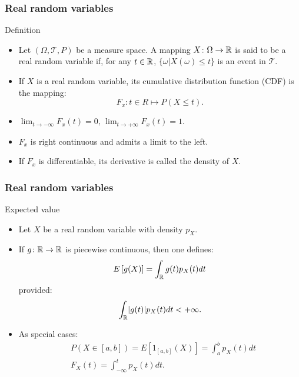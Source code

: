\begin{frame}
    \frametitle{Real random variables}
\begin{block}{Definition}
    \begin{itemize}
    \item<+-> Let $\left( \Omega, \mathcal{T}, P \right)$ be a measure space. A mapping $X \colon \Omega \to \mathbb{R}$ is
    said to be a real random variable if, for any $t \in \mathbb{R}$, $\{ \omega \vert X(\omega) \leq t \}$ is an event in $\mathcal{T}.$
    \item<+-> If $X$ is a real random variable, its cumulative distribution function (CDF) is the mapping:
    \begin{equation}
        F_x \colon t \in R \mapsto P\left( X \leq t \right).
    \end{equation}
    \item<+-> $\lim_{t \to -\infty}F_x(t) = 0, \, \lim_{t \to +\infty} F_x(t)=1.$
    \item<+-> $F_x$ is right continuous and admits a limit to the left.
    \item<+-> If $F_x$ is differentiable, its derivative is called the density of $X$.
    \end{itemize}
\end{block}
\end{frame}
\begin{frame}
    \frametitle{Real random variables}
\begin{block}{Expected value}
    \begin{itemize}
    \item<+-> Let $X$ be a real random variable with density $p_X$. 
    \item<+-> If $g \colon \mathbb{R} \to \mathbb{R}$ is piecewise continuous, then one defines:
    \begin{equation}
        E\left[ g(X) \right] = \int_{\mathbb{R}} g(t) p_X(t) dt
    \end{equation} 
    provided:
\begin{equation}
    \int_{\mathbb{R}} \lvert g(t) \rvert p_X(t) dt < +\infty.
\end{equation}
    \item<+-> As special cases:
    \begin{equation}
        \begin{split}
        & P\left( X \in [a,b] \right) = E \left[ 1_{[a,b]}(X) \right] = \int_a^b p_X(t) dt \\
        & F_X(t) = \int_{-\infty}^t p_X(t) dt.
        \end{split}
    \end{equation}
\end{itemize}
\end{block}
\end{frame}
